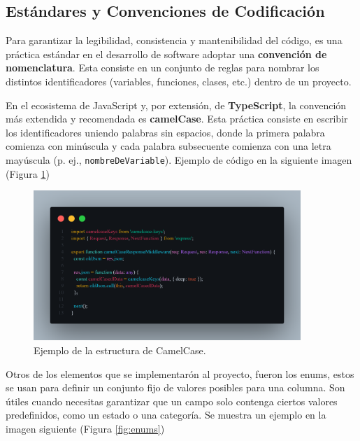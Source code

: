 \documentclass[12pt,letterpaper,spanish]{report}
\begin{document}
\subsection{Estándares y Convenciones de Codificación}
\label{sec:estandares_codigo}

Para garantizar la legibilidad, consistencia y mantenibilidad del código, es una práctica estándar en el desarrollo de software adoptar una \textbf{convención de nomenclatura}. Esta consiste en un conjunto de reglas para nombrar los distintos identificadores (variables, funciones, clases, etc.) dentro de un proyecto.

En el ecosistema de JavaScript y, por extensión, de \textbf{TypeScript}, la convención más extendida y recomendada es \textbf{camelCase}. Esta práctica consiste en escribir los identificadores uniendo palabras sin espacios, donde la primera palabra comienza con minúscula y cada palabra subsecuente comienza con una letra mayúscula (p. ej., \texttt{nombreDeVariable}). Ejemplo de código en la siguiente imagen (Figura \ref{fig:camelcase})

\begin{figure}[H]
    \centering
    \includegraphics[width=0.9\textwidth]{camelcase.png}
    \caption{Ejemplo de la estructura de CamelCase.}
    \label{fig:camelcase}
\end{figure}

Otros de los elementos que se implementarón al proyecto, fueron los enums, estos se usan para definir un conjunto fijo de valores posibles para una columna. Son útiles cuando necesitas garantizar que un campo solo contenga ciertos valores predefinidos, como un estado o una categoría. Se muestra un ejemplo en la imagen siguiente (Figura \ref{fig:enums})
\end{document}
